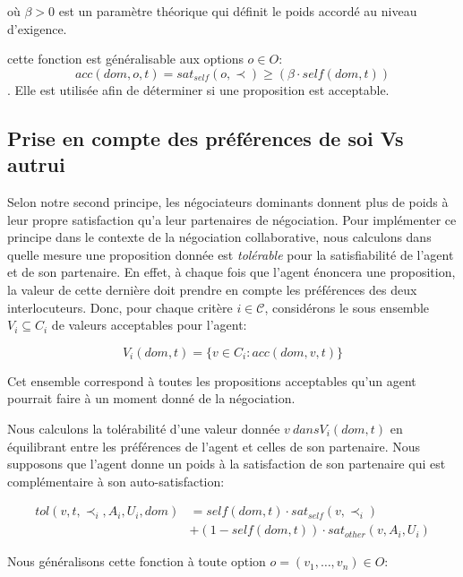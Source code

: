 	\medskip
	où $\beta>0$ est un paramètre théorique qui définit le poids accordé au niveau d'exigence.
	
	cette fonction est généralisable aux options $o \in O$:
	 $$acc(dom,o, t) = sat_{self}(o, \prec) \geq  (\beta \cdot self(dom,t))$$. Elle est utilisée afin de déterminer si une proposition est acceptable.
	
	
	
	
	\subsection {Prise en compte des préférences de soi Vs autrui}
	Selon notre second principe, les négociateurs dominants donnent plus de poids à leur propre satisfaction qu'a leur partenaires de négociation. 
	Pour implémenter ce principe dans le contexte de la négociation collaborative, nous calculons dans quelle mesure une proposition donnée est \emph{tolérable} pour la satisfiabilité de l'agent et de son partenaire.
	En effet, à chaque fois que l'agent énoncera une proposition, la valeur de cette dernière doit prendre en compte les préférences des deux interlocuteurs. 
	Donc, pour chaque critère $i\in\mathcal{C}$, considérons le sous ensemble $V_i\subseteq C_i$ de valeurs acceptables pour l'agent:

	\begin{equation}
	V_i(dom,t) = \{ v\in C_i : acc(dom,v,t) \}
	\end{equation}
	
	Cet ensemble correspond à toutes les propositions acceptables qu'un agent pourrait faire à un moment donné de la négociation.
	
	Nous calculons la tolérabilité d'une valeur donnée $ v \ dans V_i (dom, t) $ en équilibrant entre les préférences de l'agent et celles de son partenaire. Nous supposons que l'agent donne un poids à la satisfaction de son partenaire qui est complémentaire à son auto-satisfaction:
	
	\begin{equation}
	\begin{split}
	tol(v, t, \prec_i, A_i, U_i, dom) & = self(dom, t)  \cdot sat_{self}(v, \prec_i) \\
	& +  (1 - self(dom, t)) \cdot sat_{other}(v, A_i, U_i)
	\end{split} 
	\end{equation}
	

	Nous généralisons cette fonction à toute option $o=(v_1,\ldots,v_n) \in O$:
	
